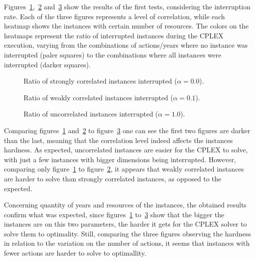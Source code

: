 Figures~\ref{fig:result00},~\ref{fig:result01} and~\ref{fig:result10} show the results of the first tests, 
considering the interruption rate. Each of the three figures represents a level of correlation, while each heatmap 
shows the instances with certain number of resources. The colors on the heatmaps represent the ratio of interrupted 
instances during the CPLEX execution, varying from the combinations of actions/years where no instance was interrupted 
(paler squares) to the combinations where all instances were interrupted (darker squares).

\begin{figure}[H]
  \centering
    \subfloat[1 resource]{}
    \subfloat[2 resources]{}
    \subfloat[4 resources]{}
  \caption{Ratio of strongly correlated instances interrupted ($\alpha = 0.0$).}
  \label{fig:result00}
\end{figure}

\begin{figure}[H]
  \centering
    \subfloat[1 resource]{}
    \subfloat[2 resources]{}
    \subfloat[4 resources]{}
  \caption{Ratio of weakly correlated instances interrupted ($\alpha = 0.1$).}
  \label{fig:result01}
\end{figure}

\begin{figure}[H]
  \centering
    \subfloat[1 resource]{}
    \subfloat[2 resources]{}
    \subfloat[4 resources]{}
  \caption{Ratio of uncorrelated instances interrupted ($\alpha = 1.0$).}
  \label{fig:result10}
\end{figure}

Comparing figures~\ref{fig:result00} and~\ref{fig:result01} to figure~\ref{fig:result10} one can see the first two figures are darker 
than the last, meaning that the correlation level indeed affects the instances hardness. As expected, uncorrelated instances
are easier for the CPLEX to solve, with just a few instances with bigger dimensions being interrupted. However, comparing only 
figure~\ref{fig:result00} to figure~\ref{fig:result01}, it appears that weakly correlated instances are harder to solve than
strongly correlated instances, as opposed to the expected.

Concerning quantity of years and resources of the instances, the obtained results confirm what was expected, since 
figures~\ref{fig:result00} to~\ref{fig:result10}
show that the bigger the instances are on this two parameters, the harder it gets for the CPLEX solver to solve them to optimality. 
Still, comparing the three figures observing the hardness in relation to the variation on the number of actions, it seems that instances with fewer actions are 
harder to solve to optimallity.

